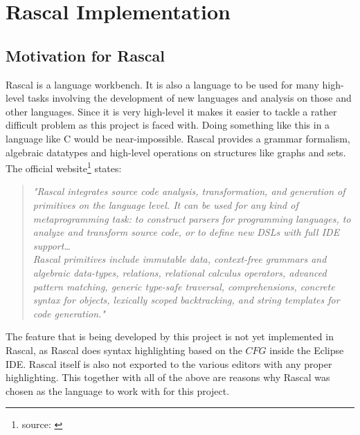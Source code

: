 
\chapter{Rascal Implementation} %

\label{chap:Implementation} %

\section{Motivation for Rascal} \label{sec:RascalMotivation}
Rascal is a language workbench. It is also a language to be used for many high-level tasks involving the development of new languages and analysis on those and other languages. Since it is very high-level it makes it easier to tackle a rather difficult problem as this project is faced with. Doing something like this in a language like C would be near-impossible. Rascal provides a grammar formalism, algebraic datatypes and high-level operations on structures like graphs and sets.\\ 
The official website\footnote{source: \cite{website:Rascal}} states:
\begin{quotation}\textit{
"Rascal integrates source code analysis, transformation, and generation of primitives on the language level. It can be used for any kind of metaprogramming task: to construct parsers for programming languages, to analyze and transform source code, or to define new DSLs with full IDE support\ldots\\ Rascal primitives include immutable data, context-free grammars and algebraic data-types, relations, relational calculus operators, advanced pattern matching, generic type-safe traversal, comprehensions, concrete syntax for objects, lexically scoped backtracking, and string templates for code generation."
}\end{quotation}
The feature that is being developed by this project is not yet implemented in Rascal, as Rascal does syntax highlighting based on the $CFG$ inside the Eclipse IDE. Rascal itself is also not exported to the various editors with any proper highlighting. This together with all of the above are reasons why Rascal was chosen as the language to work with for this project.

\pagebreak
